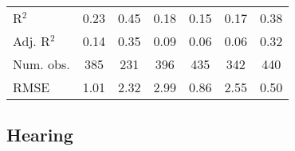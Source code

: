 \documentclass[fullpage]{paper}
\begin{document}
\begin{center}
\begin{longtable}{l c c c c c c }
\hline
R$^2$       & 0.23         & 0.45           & 0.18          & 0.15         & 0.17          & 0.38          \\
Adj. R$^2$  & 0.14         & 0.35           & 0.09          & 0.06         & 0.06          & 0.32          \\
Num. obs.   & 385          & 231            & 396           & 435          & 342           & 440           \\
RMSE        & 1.01         & 2.32           & 2.99          & 0.86         & 2.55          & 0.50          \\
\end{longtable}
\end{center}
\subsection{ Hearing }
\end{document}

